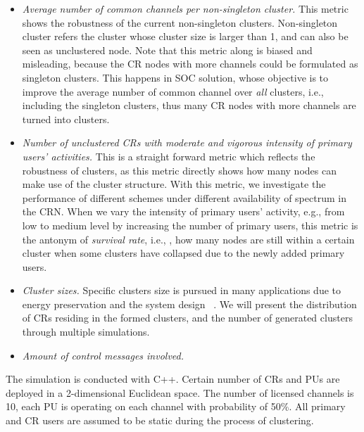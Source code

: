 \documentclass[10pt,journal,compsoc]{IEEEtran}
\theoremstyle{mytheoremstyle}
\theoremstyle{mytheoremstyle}
\theoremstyle{mytheoremstyle}
\newcommand{\eg}{e.g., }
\newcommand{\ie}{i.e., }
\begin{document}
\begin{itemize}
\item \textit{Average number of common channels per non-singleton cluster.} 
This metric shows the robustness of the current non-singleton clusters.
Non-singleton cluster refers the cluster whose cluster size is larger than 1, and can also be seen as unclustered node.
Note that this metric along is biased and misleading, because the CR nodes with more channels could be formulated as singleton clusters.
This happens in SOC solution, whose objective is to improve the average number of common channel over \textit{all} clusters, \ie including the singleton clusters, thus many CR nodes with more channels are turned into clusters.


\item \textit{Number of unclustered CRs with moderate and vigorous intensity of primary users' activities.}
This is a straight forward metric which reflects the robustness of clusters, as this metric directly shows how many nodes can make use of the cluster structure.
With this metric, we investigate the performance of different schemes under different availability of spectrum in the CRN.
When we vary the intensity of primary users' activity, \eg from low to medium level by increasing the number of primary users, this metric is the antonym of \textit{survival rate}, \ie, how many nodes are still within a certain cluster when some clusters have collapsed due to the newly added primary users.


\item \textit{Cluster sizes.}
Specific clusters size is pursued in many applications due to energy preservation and the system design ~\cite{clustering_globecom11}.
We will present the distribution of CRs residing in the formed clusters, and the number of generated clusters through multiple simulations.

\item \textit{Amount of control messages involved.}

\end{itemize}

The simulation is conducted with C++. 
Certain number of CRs and PUs are deployed in a 2-dimensional Euclidean space.
The number of licensed channels is 10, each PU is operating on each channel with probability of 50\%.
All primary and CR users are assumed to be static during the process of clustering.
\end{document}
